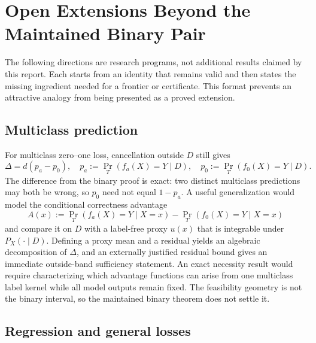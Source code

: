 \section{Open Extensions Beyond the Maintained Binary Pair}
\label{fr:sec-open-extensions}

The following directions are research programs, not additional results claimed by this report.
Each starts from an identity that remains valid and then states the missing ingredient needed for a
frontier or certificate.  This format prevents an attractive analogy from being presented as a
proved extension.

\subsection{Multiclass prediction}
\label{fr:subsec-multiclass-open}

For multiclass zero--one loss, cancellation outside $D$ still gives
\begin{equation}
  \Delta
  =d\left(p_a-p_0\right),
  \quad
  p_a:=\Pr_T(f_a(X)=Y\mid D),
  \quad
  p_0:=\Pr_T(f_0(X)=Y\mid D).
  \label{fr:eq-multiclass-reduction}
\end{equation}
The difference from the binary proof is exact: two distinct multiclass predictions may both be
wrong, so $p_0$ need not equal $1-p_a$.  A useful generalization would model the conditional
correctness advantage
\begin{equation}
  A(x):=\Pr_T(f_a(X)=Y\mid X=x)
        -\Pr_T(f_0(X)=Y\mid X=x)
  \label{fr:eq-multiclass-advantage}
\end{equation}
and compare it on $D$ with a label-free proxy $u(x)$ that is integrable under
$P_X(\cdot\mid D)$.  Defining a proxy mean and a residual yields an
algebraic decomposition of $\Delta$, and an externally justified residual bound gives an immediate
outside-band sufficiency statement.  An exact necessity result would require characterizing which
advantage functions can arise from one multiclass label kernel while all model outputs remain
fixed.  The feasibility geometry is not the binary interval, so the maintained binary theorem does
not settle it.

\subsection{Regression and general losses}
\label{fr:subsec-regression-open}

